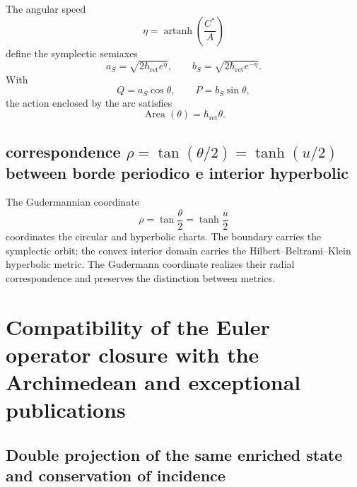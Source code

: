 The angular speed
\begin{equation}
 \eta=\operatorname{artanh}\!\left(\frac{C^*}{A}\right)
 \label{eq:l9s102:euler-rapidez}
\end{equation}
define the symplectic semiaxes
\begin{equation}
 a_S=\sqrt{2\hbar_{\mathrm{ret}}e^\eta},
 \qquad
 b_S=\sqrt{2\hbar_{\mathrm{ret}}e^{-\eta}}.
 \label{eq:l9s102:euler-semiejes}
\end{equation}
With
\begin{equation}
 Q=a_S\cos\theta,
 \qquad
 P=b_S\sin\theta,
 \label{eq:l9s102:euler-qp}
\end{equation}
the action enclosed by the arc satisfies
\begin{equation}
 \boxed{\operatorname{Area}(\theta)=\hbar_{\mathrm{ret}}\theta.}
 \label{eq:l9s102:euler-area-accion}
\end{equation}

\subsection{correspondence \texorpdfstring{\(\rho=\tan(\theta/2)=\tanh(u/2)\)}{rho=tan(theta/2)=tanh(u/2)} between borde periodico e interior hyperbolic}

The Gudermannian coordinate
\begin{equation}
 \rho=\tan\frac\theta2=\tanh\frac u2
 \label{eq:l9s102:euler-gudermann}
\end{equation}
coordinates the circular and hyperbolic charts. The boundary carries the
symplectic orbit; the convex interior domain carries the
Hilbert--Beltrami--Klein hyperbolic metric. The Gudermann coordinate realizes
their radial correspondence and preserves the distinction between metrics.

\section{Compatibility of the Euler operator closure with the Archimedean and exceptional publications}
\label{sec:l9s102:euler-doble-proyeccion}

\subsection{Double projection of the same enriched state and conservation of incidence}

